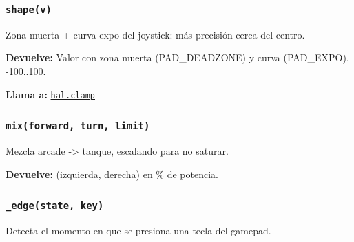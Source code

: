 \subsubsection{\texttt{shape(v)}}\label{fn:manual:shape}
\noindent Zona muerta + curva expo del joystick: más precisión cerca del centro.

\par{}\par\smallskip
\noindent\textbf{Devuelve:} Valor con zona muerta (PAD\_DEADZONE) y curva (PAD\_EXPO), -100..100.\par
\noindent\textbf{Llama a:} \hyperref[fn:hal:clamp]{\texttt{hal.clamp}}\par

\subsubsection{\texttt{mix(forward, turn, limit)}}\label{fn:manual:mix}
\noindent Mezcla arcade -> tanque, escalando para no saturar.

\par{}\par\smallskip
\noindent\textbf{Devuelve:} (izquierda, derecha) en \% de potencia.\par

\subsubsection{\texttt{\_\allowbreak{}edge(state, key)}}\label{fn:manual:-edge}
\noindent Detecta el momento en que se presiona una tecla del gamepad.


